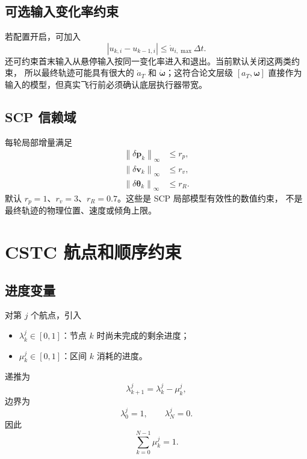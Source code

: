 \documentclass[UTF8,a4paper,11pt]{ctexart}
\newcommand{\norminf}[1]{\left\lVert #1\right\rVert_\infty}
\begin{document}
\subsection{可选输入变化率约束}

若配置开启，可加入
\begin{equation}
  |u_{k,i}-u_{k-1,i}|\leq \dot u_{i,\max}\Delta t .
  \label{eq:input-rate}
\end{equation}
还可约束首末输入从悬停输入按同一变化率进入和退出。当前默认关闭这两类约束，
所以最终轨迹可能具有很大的 $\dot a_T$ 和 $\dot{\bm\omega}$；这符合论文层级
$[a_T,\bm\omega]$ 直接作为输入的模型，但真实飞行前必须确认底层执行器带宽。

\subsection{SCP 信赖域}

每轮局部增量满足
\begin{subequations}
\label{eq:trust-regions}
\begin{align}
  \norminf{\delta\bm p_k}&\leq r_p,\\
  \norminf{\delta\bm v_k}&\leq r_v,\\
  \norminf{\delta\bm\theta_k}&\leq r_R.
\end{align}
\end{subequations}
默认 $r_p=1$、$r_v=3$、$r_R=0.7$。这些是 SCP 局部模型有效性的数值约束，
不是最终轨迹的物理位置、速度或倾角上限。

\section{CSTC 航点和顺序约束}

\subsection{进度变量}

对第 $j$ 个航点，引入
\begin{itemize}[leftmargin=2em]
  \item $\lambda_k^j\in[0,1]$：节点 $k$ 时尚未完成的剩余进度；
  \item $\mu_k^j\in[0,1]$：区间 $k$ 消耗的进度。
\end{itemize}
递推为
\begin{equation}
  \lambda_{k+1}^j=\lambda_k^j-\mu_k^j,
  \label{eq:progress-dynamics}
\end{equation}
边界为
\begin{equation}
  \lambda_0^j=1,\qquad \lambda_N^j=0.
  \label{eq:progress-boundary}
\end{equation}
因此
\begin{equation}
  \sum_{k=0}^{N-1}\mu_k^j=1.
  \label{eq:mu-sum}
\end{equation}
\end{document}
